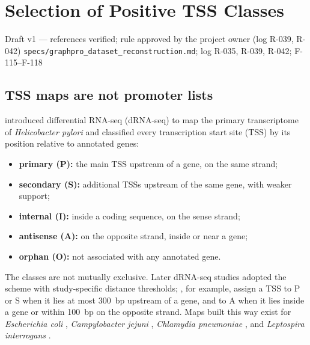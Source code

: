 
\section{Selection of Positive TSS Classes}\label{draft:tss-class-selection}

{Draft v1 --- references verified; rule approved by the project owner (log R-039, R-042)}
{\texttt{specs/graphpro\_dataset\_reconstruction.md}; log R-035, R-039, R-042; F-115--F-118}

\subsection{TSS maps are not promoter lists}

\citet{sharma2010primary} introduced differential RNA-seq (dRNA-seq) to map the
primary transcriptome of \textit{Helicobacter pylori} and classified every
transcription start site (TSS) by its position relative to annotated genes:
\begin{itemize}
  \item \textbf{primary (P):} the main TSS upstream of a gene, on the same
    strand;
  \item \textbf{secondary (S):} additional TSSs upstream of the same gene,
    with weaker support;
  \item \textbf{internal (I):} inside a coding sequence, on the sense strand;
  \item \textbf{antisense (A):} on the opposite strand, inside or near a gene;
  \item \textbf{orphan (O):} not associated with any annotated gene.
\end{itemize}
The classes are not mutually exclusive. Later dRNA-seq studies adopted the
scheme with study-specific distance thresholds; \citet{dugar2013campylobacter},
for example, assign a TSS to P or S when it lies at most 300~bp upstream of a
gene, and to A when it lies inside a gene or within 100~bp on the opposite
strand. Maps built this way exist for \textit{Escherichia coli}
\citep{thomason2015ecoli}, \textit{Campylobacter jejuni}
\citep{dugar2013campylobacter}, \textit{Chlamydia pneumoniae}
\citep{albrecht2011chlamydia}, and \textit{Leptospira interrogans}
\citep{zhukova2017leptospira}.

